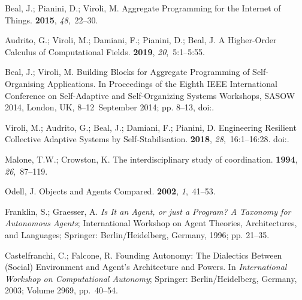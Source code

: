 \documentclass[jsan,article,accept,moreauthors,pdftex]{Definitions/mdpi}
\begin{document}
\begin{thebibliography}{999}
Beal, J.; Pianini, D.; Viroli, M.
\newblock Aggregate Programming for the Internet of Things.
 {\bf 2015}, {\em 48},~22--30.

Audrito, G.; Viroli, M.; Damiani, F.; Pianini, D.; Beal, J.
\newblock A Higher-Order Calculus of Computational Fields.
 {\bf 2019}, {\em 20},~5:1--5:55.

Beal, J.; Viroli, M.
\newblock Building Blocks for Aggregate Programming of Self-Organising
  Applications.
\newblock   In Proceedings of the Eighth {IEEE} International Conference on Self-Adaptive and
  Self-Organizing Systems Workshops, {SASOW} 2014, London, UK, \mbox{8--12
  September} 2014; pp. 8--13,
\newblock
  doi:{\href{https://doi.org/10.1109/SASOW.2014.6}{}}.

Viroli, M.; Audrito, G.; Beal, J.; Damiani, F.; Pianini, D.
\newblock Engineering Resilient Collective Adaptive Systems by
  Self-Stabilisation.
 {\bf 2018}, {\em
  28},~16:1--16:28.
\newblock
  doi:{\href{https://doi.org/10.1145/3177774}{}}.

Malone, T.W.; Crowston, K.
\newblock The interdisciplinary study of coordination.
 {\bf 1994}, {\em 26},~87--119.

Odell, J.
\newblock Objects and Agents Compared.
 {\bf 2002}, {\em 1},~41--53.

Franklin, S.; Graesser, A.
\newblock \emph{Is It an Agent, or just a Program? A Taxonomy for Autonomous Agents};
\newblock  International Workshop on Agent Theories, Architectures, and
  Languages; Springer:  Berlin/Heidelberg, Germany, %
  1996; pp. 21--35.

Castelfranchi, C.; Falcone, R.
\newblock Founding Autonomy: The Dialectics Between (Social) Environment and
  Agent's Architecture and Powers.
\newblock  In \emph{International Workshop on Computational Autonomy}; Springer: Berlin/Heidelberg, Germany,  2003; Volume 2969,  pp.~40--54.


\end{thebibliography}
\end{document}

